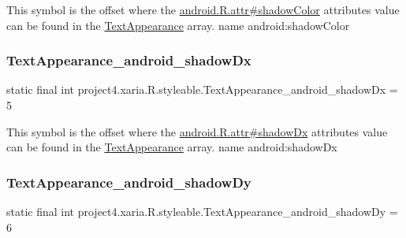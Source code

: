 This symbol is the offset where the \hyperlink{}{android.\+R.\+attr\#shadow\+Color} attribute\textquotesingle{}s value can be found in the \hyperlink{classproject4_1_1xaria_1_1R_1_1styleable_a324a4bda63d9f00d154e0a6c1eb718b0}{Text\+Appearance} array.  name android\+:shadow\+Color \mbox{\label{classproject4_1_1xaria_1_1R_1_1styleable_a03f619c3ba347ef286757141c03559b5}} 
\subsubsection{\texorpdfstring{Text\+Appearance\+\_\+android\+\_\+shadow\+Dx}{TextAppearance\_android\_shadowDx}}
{\footnotesize\ttfamily static final int project4.\+xaria.\+R.\+styleable.\+Text\+Appearance\+\_\+android\+\_\+shadow\+Dx = 5\hspace{0.3cm}{\ttfamily [static]}}

This symbol is the offset where the \hyperlink{}{android.\+R.\+attr\#shadow\+Dx} attribute\textquotesingle{}s value can be found in the \hyperlink{classproject4_1_1xaria_1_1R_1_1styleable_a324a4bda63d9f00d154e0a6c1eb718b0}{Text\+Appearance} array.  name android\+:shadow\+Dx \mbox{\label{classproject4_1_1xaria_1_1R_1_1styleable_ada1ad6d6bac889ac788f60bdf29ddc1c}} 
\subsubsection{\texorpdfstring{Text\+Appearance\+\_\+android\+\_\+shadow\+Dy}{TextAppearance\_android\_shadowDy}}
{\footnotesize\ttfamily static final int project4.\+xaria.\+R.\+styleable.\+Text\+Appearance\+\_\+android\+\_\+shadow\+Dy = 6\hspace{0.3cm}{\ttfamily [static]}}

